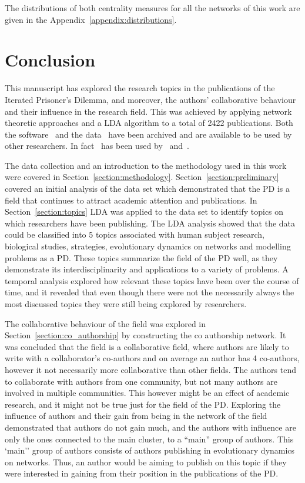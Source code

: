 The distributions of both centrality measures for all the networks of this
work are given in the Appendix~\ref{appendix:distributions}.

\section{Conclusion}\label{section:conclusion}

This manuscript has explored the research topics in the publications of the
Iterated Prisoner's Dilemma, and moreover, the authors' collaborative behaviour
and their influence in the research field. This was achieved by
applying network theoretic approaches and a LDA algorithm to a total of 2422
publications. Both the software~\cite{nikoleta_2017} and the data~\cite{nikoleta_2017}
have been archived and are available to be used by other researchers. In
fact~\cite{nikoleta_2017} has been used by~\cite{brane} and~\cite{arcas_blog}.

The data collection and an introduction to the methodology used in this work
were covered in Section~\ref{section:methodology}.
Section~\ref{section:preliminary} covered an initial analysis of the data set
which demonstrated that the PD is a field that continues to attract academic
attention and publications. In Section~\ref{section:topics} LDA was
applied to the data set to identify topics on which researchers have been
publishing. The LDA analysis showed that the data could be classified into 5
topics associated with human subject research, biological studies, strategies,
evolutionary dynamics on networks and modelling
problems as a PD. These topics summarize the field of the PD well, as they
demonstrate its interdisciplinarity and applications to a variety of problems. A
temporal analysis explored how relevant these topics have been over the course
of time, and it revealed that even though there were not the necessarily always
the most discussed topics they were still being explored by researchers.

The collaborative behaviour of the field was explored in
Section~\ref{section:co_authorship} by constructing the co authorship network.
It was concluded that the field is a collaborative field, where authors are
likely to write with a collaborator's co-authors and on average an author has 4
co-authors, however it not necessarily more collaborative than other fields. The
authors tend to collaborate with authors from one community, but not many
authors are involved in multiple communities. This however
might be an effect of academic research, and it might not be true just for the
field of the PD. Exploring the influence of authors and their gain from being in
the network of the field demonstrated that authors do not gain much, and the
authors with influence are only the ones connected to the main cluster, to a
``main'' group of authors. This `main'' group of authors consists of authors
publishing in evolutionary dynamics on networks. Thus, an author would be aiming
to publish on this topic if they were interested in gaining from their position
in the publications of the PD.

